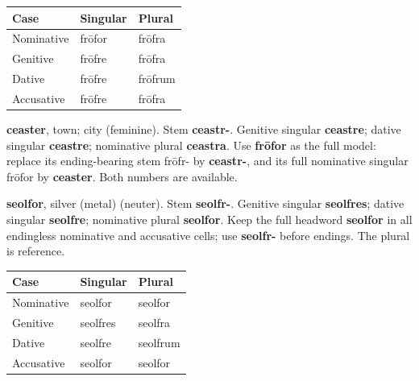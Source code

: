 \par\begingroup
\fontsize{10.5}{13.2}\selectfont
\setlength{\LTleft}{0pt}\setlength{\LTright}{\fill}
\noindent
\begin{tabular}{@{}>{\raggedright\arraybackslash}p{39.46mm}>{\raggedright\arraybackslash}p{39.46mm}>{\raggedright\arraybackslash}p{39.46mm}@{}}
\toprule
\textbf{Case} & \textbf{Singular} & \textbf{Plural} \\
\midrule
Nominative & frōfor & frōfra \\
Genitive & frōfre & frōfra \\
Dative & frōfre & frōfrum \\
Accusative & frōfre & frōfra \\
\bottomrule
\end{tabular}
\par\endgroup

\textbf{ceaster}, town; city (feminine). Stem \textbf{ceastr-}. Genitive singular \textbf{ceastre}; dative singular \textbf{ceastre}; nominative plural \textbf{ceastra}. Use \textbf{frōfor} as the full model: replace its ending-bearing stem frōfr- by \textbf{ceastr-}, and its full nominative singular frōfor by \textbf{ceaster}. Both numbers are available.

\textbf{seolfor}, silver (metal) (neuter). Stem \textbf{seolfr-}. Genitive singular \textbf{seolfres}; dative singular \textbf{seolfre}; nominative plural \textbf{seolfor}. Keep the full headword \textbf{seolfor} in all endingless nominative and accusative cells; use \textbf{seolfr-} before endings. The plural is reference.

\par\begingroup
\fontsize{10.5}{13.2}\selectfont
\setlength{\LTleft}{0pt}\setlength{\LTright}{\fill}
\noindent
\begin{tabular}{@{}>{\raggedright\arraybackslash}p{39.46mm}>{\raggedright\arraybackslash}p{39.46mm}>{\raggedright\arraybackslash}p{39.46mm}@{}}
\toprule
\textbf{Case} & \textbf{Singular} & \textbf{Plural} \\
\midrule
Nominative & seolfor & seolfor \\
Genitive & seolfres & seolfra \\
Dative & seolfre & seolfrum \\
Accusative & seolfor & seolfor \\
\bottomrule
\end{tabular}
\par\endgroup

